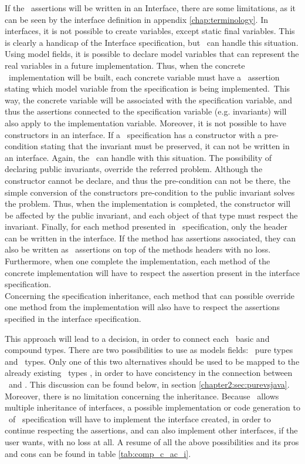 If the \jml\ assertions will be written in an Interface, there are some limitations, as it can be seen by the interface definition in appendix \ref{chap:terminology}.
In interfaces, it is not possible to create variables, except static final variables. This is clearly a handicap of the Interface specification, but \jml\ can handle this situation. Using model fields, it is possible to declare model variables that can represent the real variables in a future implementation. Thus, when the concrete \java\  implementation will be built, each concrete variable must have a \jml\ assertion stating which model variable from the specification is being implemented.\
This way, the concrete variable will be associated with the specification variable, and thus the assertions connected to the specification variable (e.g. invariants) will also apply to the implementation variable. 
Moreover, it is not possible to have constructors in an interface. If a \vpp\ specification has a constructor with a pre-condition stating that the invariant must be preserved, it can not be written in an interface. Again, the \jml\ can handle with this situation. The possibility of declaring public invariants, override the referred problem. Although the constructor cannot be declare, and thus the pre-condition can not be there, the simple conversion of the constructors pre-condition to the public invariant solves the problem. Thus, when the implementation is completed, the constructor will be affected by the public invariant, and each object of that type must respect the invariant.
Finally, for each method presented in \vpp\ specification, only the header can be written in the interface. If the method has assertions associated, they can also be written as \jml\ assertions on top of the methods headers with no loss.
Furthermore, when one complete the implementation, each method of the concrete implementation will have to respect the assertion present in the interface specification.\\
Concerning the specification inheritance, each method that can possible override one method from the implementation will also have to respect the assertions specified in the interface specification.
 
This approach will lead to a decision, in order to connect each \vpp\ basic and compound types.
There are two possibilities to use as models fields: \jml\ pure types \cite{leavens-etal07} and \java\ types. Only one of this two alternatives should be used to be mapped to the already existing \vpp\ types \cite{vpplangman}, in order to have concistency in the connection between \vpp\ and \jml.
This discussion can be found below, in section \ref{chapter2:sec:purevsjava}.
Moreover, there is no limitation concerning the inheritance. Because \java\ allows multiple inheritance of interfaces, a possible implementation or code generation to \java\  of \vpp\ specification will have to implement the interface created, in order to continue respecting the assertions, and can also implement other interfaces, if the user wants, with no loss at all.
A resume of all the above possibilities and its pros and cons can be found in table \ref{tab:comp_c_ac_i}.


